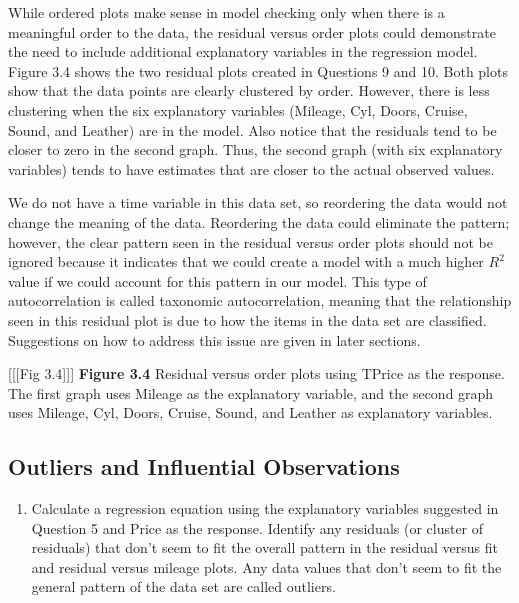 \documentclass[
]{report}
\providecommand{\tightlist}{%
  \setlength{\itemsep}{0pt}\setlength{\parskip}{0pt}}
\theoremstyle{definition}
\theoremstyle{definition}
\theoremstyle{definition}
\theoremstyle{definition}
\theoremstyle{remark}
\begin{document}
While ordered plots make sense in model checking only when there is a meaningful order to the data, the residual versus order plots could demonstrate the need to include additional explanatory variables in the regression model. Figure 3.4 shows the two residual plots created in Questions 9 and 10. Both plots show that the data points are clearly clustered by order. However, there is less clustering when the six explanatory variables (Mileage, Cyl, Doors, Cruise, Sound, and Leather) are in the model. Also notice that the residuals tend to be closer to zero in the second graph. Thus, the second graph (with six explanatory variables) tends to have estimates that are closer to the actual observed values.

We do not have a time variable in this data set, so reordering the data would not change the meaning of the data. Reordering the data could eliminate the pattern; however, the clear pattern seen in the residual versus order plots should not be ignored because it indicates that we could create a model with a much higher \(R^2\) value if we could account for this pattern in our model. This type of autocorrelation is called taxonomic autocorrelation, meaning that the relationship seen in this residual plot is due to
how the items in the data set are classified. Suggestions on how to address this issue are given in later sections.

{[}{[}{[}Fig 3.4{]}{]}{]}
\textbf{Figure 3.4} Residual versus order plots using TPrice as the response. The first graph uses Mileage as the explanatory variable, and the second graph uses Mileage, Cyl, Doors, Cruise, Sound, and Leather as explanatory variables.

\hypertarget{outliers-and-influential-observations}{%
\subsection*{Outliers and Influential Observations}\label{outliers-and-influential-observations}}

\begin{enumerate}
\def\labelenumi{\arabic{enumi}.}
\setcounter{enumi}{10}
\tightlist
\item
  Calculate a regression equation using the explanatory variables suggested in Question 5 and Price as the response. Identify any residuals (or cluster of residuals) that don't seem to fit the overall pattern in the residual versus fit and residual versus mileage plots. Any data values that don't seem to fit the general pattern of the data set are called outliers.
\end{enumerate}
\end{document}
